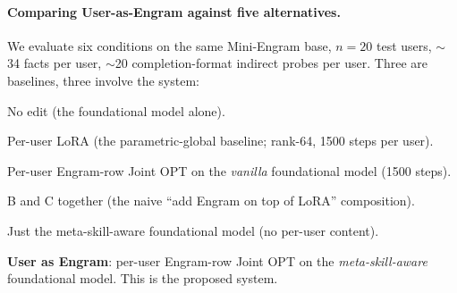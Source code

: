 \documentclass{article}
\begin{document}
\paragraph{Comparing User-as-Engram against five alternatives.}
We evaluate six conditions on the same Mini-Engram base, $n{=}20$ test
users, $\sim$34 facts per user, $\sim$20 completion-format indirect
probes per user. Three are baselines, three involve the system:
\begin{description}[leftmargin=2em,itemsep=1pt]
  \item[A.] No edit (the foundational model alone).
  \item[B.] Per-user LoRA (the parametric-global baseline; 
        rank-64, 1500 steps per user).
  \item[C.] Per-user Engram-row Joint OPT on the \emph{vanilla}
        foundational model (1500 steps).
  \item[D.] B and C together (the naive ``add Engram on top of LoRA''
        composition).
  \item[E.] Just the meta-skill-aware foundational model (no per-user
        content).
  \item[F.] \textbf{User as Engram}: per-user Engram-row Joint OPT on
        the \emph{meta-skill-aware} foundational model. This is the
        proposed system.
\end{description}
\end{document}
